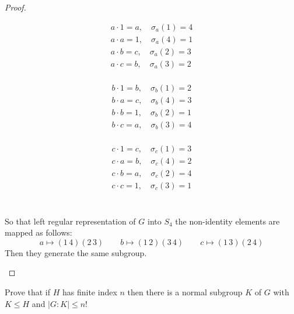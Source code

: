 \documentclass{article}
\newenvironment{problem}[2][Problem]{\begin{trivlist}
\item[\hskip \labelsep {\bfseries #1}\hskip \labelsep {\bfseries #2.}]}{\end{trivlist}}
\begin{document}
\begin{proof}
\begin{enumerate}[(a)]
\begin{minipage}{0.33\linewidth}
        \begin{align*}
            a \cdot 1 =a, \quad \sigma_a(1)=4\\
            a \cdot a = 1, \quad \sigma_a (4)=1\\
            a \cdot b = c, \quad \sigma_a (2)=3\\
            a \cdot c = b, \quad \sigma_a (3)=2\\
        \end{align*}
                \end{minipage}
                \begin{minipage}{0.33\linewidth}
                    

            \begin{align*}
            b \cdot 1 =b, \quad \sigma_b(1)=2\\
            b \cdot a = c, \quad \sigma_b (4)=3\\
            b \cdot b = 1, \quad \sigma_b (2)=1\\
            b \cdot c = a, \quad \sigma_b (3)=4\\
        \end{align*}                \end{minipage}
        \begin{minipage}{0.33\linewidth}
                    

            \begin{align*}
            c \cdot 1 =c, \quad \sigma_c(1)=3\\
            c \cdot a = b, \quad \sigma_c (4)=2\\
            c \cdot b = a, \quad \sigma_c(2)=4\\
            c \cdot c = 1, \quad \sigma_c (3)=1\\
        \end{align*}                \end{minipage}\\
        So that left regular representation of $G$ into $S_4$ the non-identity elements are mapped as follows:
        \[
         a \mapsto (1\, 4)(2 \, 3) \qquad b \mapsto (1 \, 2)(3 \, 4) \qquad c \mapsto (1 \, 3)(2 \, 4)
        \]
        Then they generate the same subgroup.
    \end{enumerate}
\end{proof}
\begin{problem}{8}
    Prove that if $H$ has finite index $n$ then there is a normal subgroup $K$ of $G$ with $K\leq H$ and $|G:K|\leq n!$
\end{problem}
\end{document}
